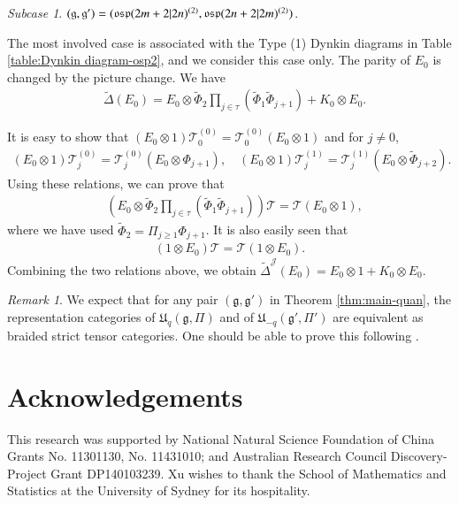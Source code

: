 \documentclass[12pt]{amsart}
\theoremstyle{definition}
\theoremstyle{remark}
\newtheorem{remark}[theorem]{Remark}
\numberwithin{equation}{section}
\newtheorem{subcase}{Subcase}[case]
\begin{document}
\begin{subcase}
$({{\mathfrak g}},{{\mathfrak g}}')=({{\rm\mathfrak{osp}}}(2m+2|2n)^{(2)}, {{\rm\mathfrak{osp}}}(2n+2|2m)^{(2)})$.
\end{subcase}

The most involved case is associated with the Type (1) Dynkin diagrams in
Table \ref{table:Dynkin diagram-osp2}, and we consider this case only.
The parity of $E_0$ is changed by the picture change. We have
\[\begin{aligned}
&{\tilde{\Delta}}(E_0)=E_0\otimes \tilde{\Phi}_2\prod_{j\in\tau}(\tilde{\Phi}_1\tilde{\Phi}_{j+1})+ K_0\otimes E_0.
\end{aligned}\]

It is easy to show that $(E_0\otimes  1){{\mathscr T}}^{(0)}_0={{\mathscr T}}^{(0)}_0(E_0\otimes 1)$ and for $j\neq 0$,
\[\begin{aligned}
(E_0\otimes  1){{\mathscr T}}^{(0)}_j={{\mathscr T}}^{(0)}_j(E_0\otimes \Phi_{j+1}),\quad (E_0\otimes  1){{\mathscr T}}^{(1)}_j={{\mathscr T}}^{(1)}_j(E_0\otimes \tilde{\Phi}_{j+2}).
\end{aligned}\]
Using these relations, we can prove that
\[\begin{aligned}
&\left(E_0\otimes  \tilde{\Phi}_2\prod_{j\in\tau}(\tilde{\Phi}_1\tilde{\Phi}_{j+1})\right){{\mathscr T}}={{\mathscr T}}(E_0\otimes 1),
\end{aligned}\]
where we have used $\tilde{\Phi}_2=\Pi_{j\ge 1}\Phi_{j+1}$. It is also easily seen that
\[\begin{aligned}
(1\otimes E_0){{\mathscr T}}  ={{\mathscr T}} (1\otimes E_0).
\end{aligned}\]
Combining the two relations above, we obtain ${\tilde{\Delta}}^{{\mathcal J}}(E_0)=E_0\otimes 1+ K_0\otimes E_0$.

\begin{remark}
We expect that for any pair $({{\mathfrak g}}, {{\mathfrak g}}')$ in Theorem  \ref{thm:main-quan}, the 
representation categories of ${{\mathfrak U}}_q({{\mathfrak g}}, \Pi)$ and of ${{\mathfrak U}}_{-q}({{\mathfrak g}}', \Pi')$ are 
equivalent as braided strict tensor categories. One should be able to prove 
this following \cite[Chapter 10.1]{Ma}.
\end{remark}

\section*{Acknowledgements}
This research was supported by National Natural Science Foundation of China Grants No. 11301130,  No. 11431010; 
and Australian Research Council Discovery-Project Grant DP140103239.
Xu wishes to thank the School of Mathematics and Statistics at the University of Sydney for its hospitality.
\end{document}
